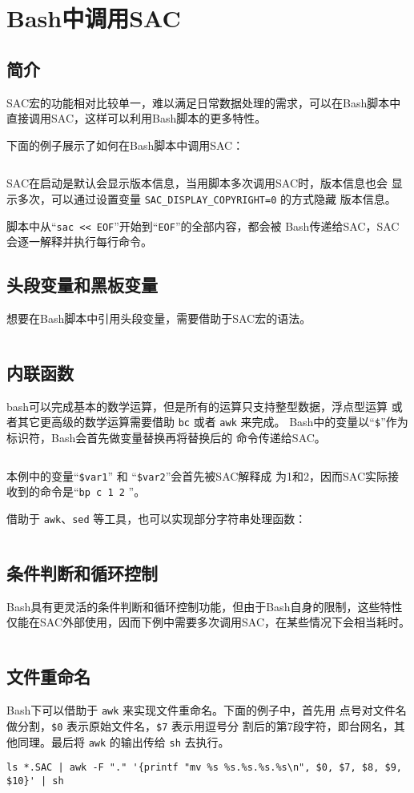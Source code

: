 \section{Bash中调用SAC}
\label{sec:sac-bash}

\subsection{简介}
SAC宏的功能相对比较单一，难以满足日常数据处理的需求，可以在Bash脚本中
直接调用SAC，这样可以利用Bash脚本的更多特性。

下面的例子展示了如何在Bash脚本中调用SAC：
\inputminted{bash}{./call-in-script/simple-script.sh}

SAC在启动是默认会显示版本信息，当用脚本多次调用SAC时，版本信息也会
显示多次，可以通过设置变量 \verb|SAC_DISPLAY_COPYRIGHT=0| 的方式隐藏
版本信息。

脚本中从``\texttt{sac << EOF}''开始到``\texttt{EOF}''的全部内容，都会被
Bash传递给SAC，SAC会逐一解释并执行每行命令。

\subsection{头段变量和黑板变量}
想要在Bash脚本中引用头段变量，需要借助于SAC宏的语法。
\inputminted{bash}{./call-in-script/variables.sh}

\subsection{内联函数}
bash可以完成基本的数学运算，但是所有的运算只支持整型数据，浮点型运算
或者其它更高级的数学运算需要借助 \texttt{bc} 或者 \texttt{awk} 来完成。
Bash中的变量以``\verb|$|''作为标识符，Bash会首先做变量替换再将替换后的
命令传递给SAC。
\inputminted{bash}{./call-in-script/arithmetic-functions.sh}

本例中的变量``\verb|$var1|'' 和 ``\verb|$var2|''会首先被SAC解释成
为1和2，因而SAC实际接收到的命令是``\texttt{bp c 1 2} ''。

借助于 \texttt{awk}、\texttt{sed} 等工具，也可以实现部分字符串处理函数：
\inputminted{bash}{./call-in-script/string-functions.sh}

\subsection{条件判断和循环控制}
Bash具有更灵活的条件判断和循环控制功能，但由于Bash自身的限制，这些特性
仅能在SAC外部使用，因而下例中需要多次调用SAC，在某些情况下会相当耗时。
\inputminted{bash}{./call-in-script/do-loops.sh}

\subsection{文件重命名}
\label{subsec:rename-in-bash}
Bash下可以借助于 \texttt{awk} 来实现文件重命名。下面的例子中，首先用
点号对文件名做分割，\verb|$0| 表示原始文件名，\verb|$7| 表示用逗号分
割后的第7段字符，即台网名，其他同理。最后将 \texttt{awk} 的输出传给
\texttt{sh} 去执行。
\begin{verbatim}
ls *.SAC | awk -F "." '{printf "mv %s %s.%s.%s.%s\n", $0, $7, $8, $9, $10}' | sh
\end{verbatim}

